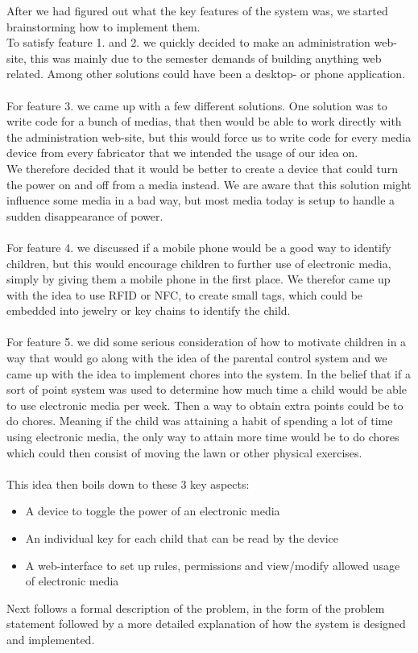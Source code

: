 After we had figured out what the key features of the system was, we started brainstorming how to implement them.\\
To satisfy feature 1. and 2. we quickly decided to make an administration web-site, this was mainly due to the semester demands of building anything web related. Among other solutions could have been a desktop- or phone application.\\
\\
For feature 3. we came up with a few different solutions. One solution was to write code for a bunch of medias, that then would be able to work directly with the administration web-site, but this would force us to write code for every media device from every fabricator that we intended the usage of our idea on.\\
We therefore decided that it would be better to create a device that could turn the power on and off from a media instead. We are aware that this solution might influence some media in a bad way, but most media today is setup to handle a sudden disappearance of power.\\
\\
For feature 4. we discussed if a mobile phone would be a good way to identify children, but this would encourage children to further use of electronic media, simply by giving them a mobile phone in the first place. We therefor came up with the idea to use RFID or NFC, to create small tags, which could be embedded into jewelry or key chains to identify the child.\\
\\
For feature 5. we did some serious consideration of how to motivate children in a way that would go along with the idea of the parental control system and we came up with the idea to implement chores into the system. In the belief that if a sort of point system was used to determine how much time a child would be able to use electronic media per week. Then a way to obtain extra points could be to do chores. Meaning if the child was attaining a habit of spending a lot of time using electronic media, the only way to attain more time would be to do chores which could then consist of moving the lawn or other physical exercises.\\
\\
This idea then boils down to these 3 key aspects:

\begin{itemize}
	\item A device to toggle the power of an electronic media
	\item An individual key for each child that can be read by the device
	\item A web-interface to set up rules, permissions and view/modify allowed usage of electronic media
\end{itemize} 

Next follows a formal description of the problem, in the form of the problem statement followed by a more detailed explanation of how the system is designed and implemented.
